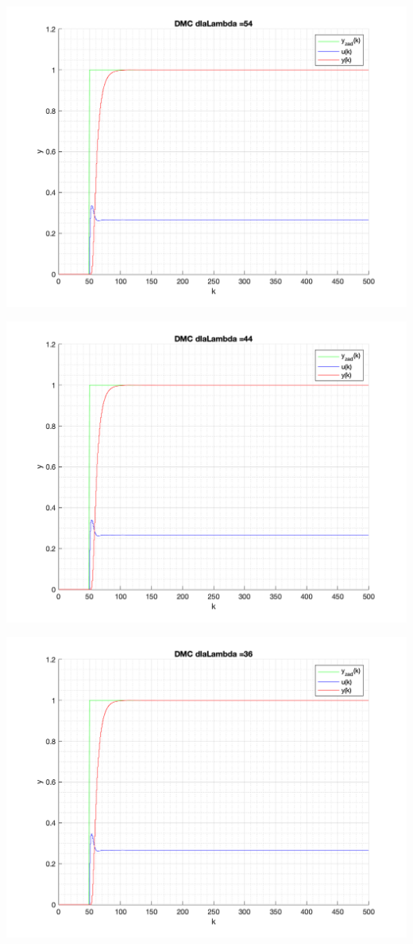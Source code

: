 \documentclass[a4paper, 11pt]{article}
\begin{document}
\begin{enumerate}
 \includegraphics[width=\linewidth]{./ModelsP4_Lambda/P4_DMC_Lambda_54_png.png} 
 
 \includegraphics[width=\linewidth]{./ModelsP4_Lambda/P4_DMC_Lambda_44_png.png} 
 
 \includegraphics[width=\linewidth]{./ModelsP4_Lambda/P4_DMC_Lambda_36_png.png} 
 

\end{enumerate}
\end{document}
